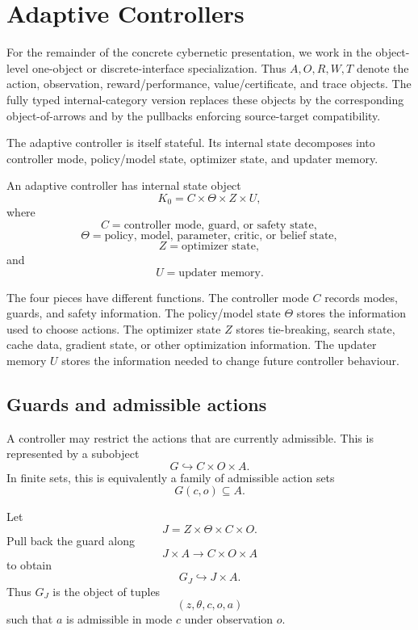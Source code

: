 \section{Adaptive Controllers}
\label{sec:adaptive-controllers-effectful}

For the remainder of the concrete cybernetic presentation, we work in the object-level
one-object or discrete-interface specialization.  Thus \(A,O,R,W,T\) denote the action,
observation, reward/performance, value/certificate, and trace objects.  The fully typed
internal-category version replaces these objects by the corresponding object-of-arrows and by the
pullbacks enforcing source-target compatibility.

The adaptive controller is itself stateful.  Its internal state decomposes into controller mode,
policy/model state, optimizer state, and updater memory.

\begin{definition}
\label{def:adaptive-controller-state-effectful}
An adaptive controller has internal state object
\[
K_0=C\times \Theta\times Z\times U,
\]
where
\[
C=\text{controller mode, guard, or safety state},
\]
\[
\Theta=\text{policy, model, parameter, critic, or belief state},
\]
\[
Z=\text{optimizer state},
\]
and
\[
U=\text{updater memory}.
\]
\end{definition}

The four pieces have different functions.  The controller mode \(C\) records modes, guards, and
safety information.  The policy/model state \(\Theta\) stores the information used to choose
actions.  The optimizer state \(Z\) stores tie-breaking, search state, cache data, gradient state,
or other optimization information.  The updater memory \(U\) stores the information needed to
change future controller behaviour.

\subsection{Guards and admissible actions}
\label{subsec:effectful-guards-admissible-actions}

A controller may restrict the actions that are currently admissible.  This is represented by a
subobject
\[
G\hookrightarrow C\times O\times A.
\]
In finite sets, this is equivalently a family of admissible action sets
\[
G(c,o)\subseteq A.
\]

Let
\[
J=Z\times\Theta\times C\times O.
\]
Pull back the guard along
\[
J\times A\to C\times O\times A
\]
to obtain
\[
G_J\hookrightarrow J\times A.
\]
Thus \(G_J\) is the object of tuples
\[
(z,\theta,c,o,a)
\]
such that \(a\) is admissible in mode \(c\) under observation \(o\).

